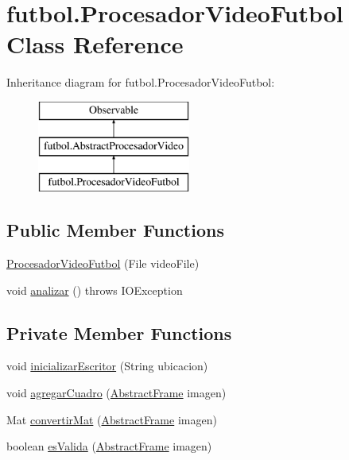 \hypertarget{classfutbol_1_1_procesador_video_futbol}{}\section{futbol.\+Procesador\+Video\+Futbol Class Reference}
\label{classfutbol_1_1_procesador_video_futbol}
Inheritance diagram for futbol.\+Procesador\+Video\+Futbol\+:\begin{figure}[H]
\begin{center}
\leavevmode
\includegraphics[height=3.000000cm]{classfutbol_1_1_procesador_video_futbol}
\end{center}
\end{figure}
\subsection*{Public Member Functions}
\begin{DoxyCompactItemize}
\item 
\hyperlink{classfutbol_1_1_procesador_video_futbol_a01fb8fa897352b416b90d4d42cd2ceeb}{Procesador\+Video\+Futbol} (File video\+File)
\item 
void \hyperlink{classfutbol_1_1_procesador_video_futbol_a5dc72e3ebc5e66187d71face1f2c4820}{analizar} ()  throws I\+O\+Exception 
\end{DoxyCompactItemize}
\subsection*{Private Member Functions}
\begin{DoxyCompactItemize}
\item 
void \hyperlink{classfutbol_1_1_procesador_video_futbol_a95adcf4bac9877ac83e8f8bd92f7fdda}{inicializar\+Escritor} (String ubicacion)
\item 
void \hyperlink{classfutbol_1_1_procesador_video_futbol_a8f17a8a5d4fc5d6d3eed46e427284b90}{agregar\+Cuadro} (\hyperlink{classfutbol_1_1_abstract_frame}{Abstract\+Frame} imagen)
\item 
Mat \hyperlink{classfutbol_1_1_procesador_video_futbol_af31900f6a534dce36238c594d897787a}{convertir\+Mat} (\hyperlink{classfutbol_1_1_abstract_frame}{Abstract\+Frame} imagen)
\item 
boolean \hyperlink{classfutbol_1_1_procesador_video_futbol_ab41c16feae7e86ec6acd5d06ff9af713}{es\+Valida} (\hyperlink{classfutbol_1_1_abstract_frame}{Abstract\+Frame} imagen)
\end{DoxyCompactItemize}
